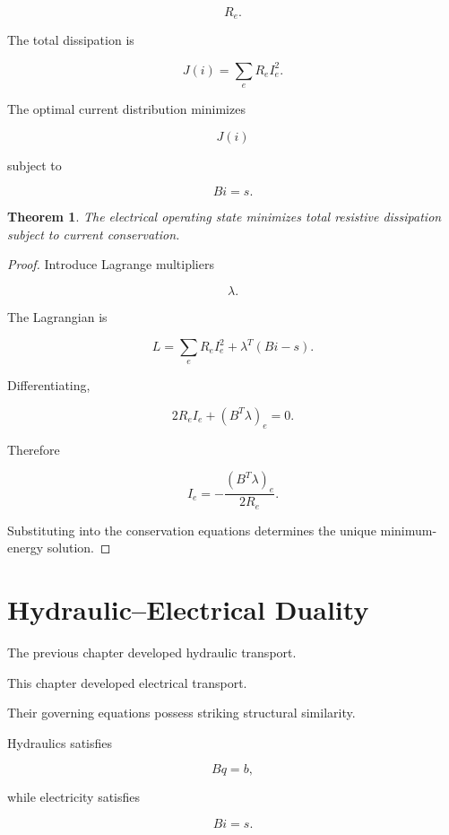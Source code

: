 \documentclass[11pt,fleqn]{book}
\numberwithin{equation}{chapter}
\theoremstyle{plain}
\newtheorem{theorem}{Theorem}[chapter]
\theoremstyle{definition}
\theoremstyle{remark}
\begin{document}
\[
R_e.
\]

The total dissipation is

\[
J(i)
=
\sum_e
R_eI_e^2.
\]

The optimal current distribution minimizes

\[
J(i)
\]

subject to

\[
Bi=s.
\]


\begin{theorem}

The electrical operating state minimizes total resistive dissipation
subject to current conservation.

\end{theorem}

\begin{proof}

Introduce Lagrange multipliers

\[
\lambda.
\]

The Lagrangian is

\[
L
=
\sum_e
R_eI_e^2
+
\lambda^T(Bi-s).
\]

Differentiating,

\[
2R_eI_e
+
(B^T\lambda)_e
=
0.
\]

Therefore

\[
I_e
=
-
\frac{
(B^T\lambda)_e
}
{2R_e}.
\]

Substituting into the conservation equations determines the unique
minimum-energy solution.

\end{proof}


\section{Hydraulic--Electrical Duality}

The previous chapter developed hydraulic transport.

This chapter developed electrical transport.

Their governing equations possess striking structural similarity.

Hydraulics satisfies

\[
Bq=b,
\]

while electricity satisfies

\[
Bi=s.
\]
\end{document}
